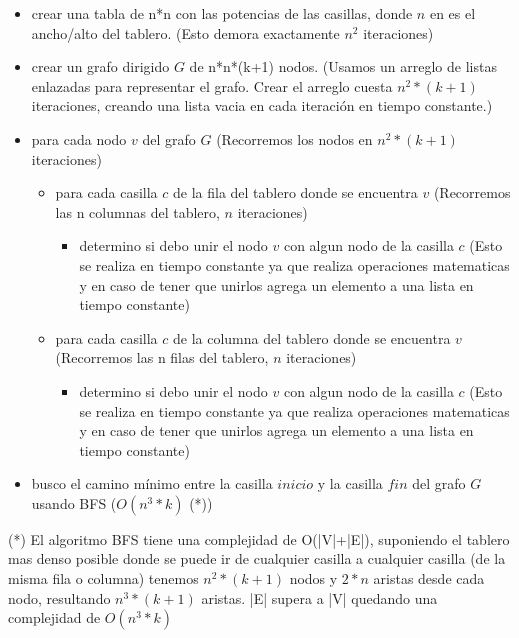 \begin{itemize}
\item crear una tabla de n*n con las potencias de las casillas, donde $n$ en es el ancho/alto del tablero. (Esto demora exactamente $n^2$ iteraciones)
\item crear un grafo dirigido $G$ de n*n*(k+1) nodos. (Usamos un arreglo de listas enlazadas para representar el grafo. Crear el arreglo cuesta $n^2*(k+1)$ iteraciones, creando una lista vacia en cada iteraci\'on en tiempo constante.)
\item para cada nodo $v$ del grafo $G$ (Recorremos los nodos en $n^2*(k+1)$ iteraciones)
	\begin{itemize}
	\item para cada casilla $c$ de la fila del tablero donde se encuentra $v$ (Recorremos las n columnas del tablero, $n$ iteraciones)
		\begin{itemize}
			\item determino si debo unir el nodo $v$ con algun nodo de la casilla $c$ (Esto se realiza en tiempo constante ya que realiza operaciones matematicas y en caso de tener que unirlos agrega un elemento a una lista en tiempo constante)
		\end{itemize}
	\end{itemize}
	\begin{itemize}
	\item para cada casilla $c$ de la columna del tablero donde se encuentra $v$ (Recorremos las n filas del tablero, $n$ iteraciones)
		\begin{itemize}
			\item determino si debo unir el nodo $v$ con algun nodo de la casilla $c$ (Esto se realiza en tiempo constante ya que realiza operaciones matematicas y en caso de tener que unirlos agrega un elemento a una lista en tiempo constante)
		\end{itemize}
	\end{itemize}
\item busco el camino m\'inimo entre la casilla $inicio$ y la casilla $fin$ del grafo $G$ usando BFS ($O(n^3*k)$ (*))
\end{itemize}

(*) El algoritmo BFS tiene una complejidad de O(|V|+|E|), suponiendo el tablero mas denso posible donde se puede ir de cualquier casilla a cualquier casilla (de la misma fila o columna) tenemos $n^2*(k+1)$ nodos y $2*n$ aristas desde cada nodo, resultando $n^3*(k+1)$ aristas. |E| supera a |V| quedando una complejidad de $O(n^3*k)$ \\

